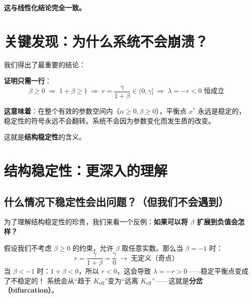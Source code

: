 \documentclass[12pt,a4paper]{article}
\begin{document}
\textbf{这与线性化结论完全一致。}

\section{关键发现：为什么系统不会崩溃？}

我们得出了最重要的结论：

\begin{center}
\end{center}

\textbf{证明只需一行}：
\[
\beta \geq 0 \;\Rightarrow\; 1+\beta \geq 1 \;\Rightarrow\; r = \frac{\gamma}{1+\beta} \in (0, \gamma]
\;\Rightarrow\; \lambda = -r < 0 \text{ 恒成立}
\]

\textbf{这意味着}：在整个有效的参数空间内（$\alpha \geq 0, \beta \geq 0$），平衡点 $x^*$ 永远是稳定的，稳定性的符号永远不会翻转。系统不会因为参数变化而发生质的改变。

这就是\textbf{结构稳定性}的含义。

\section{结构稳定性：更深入的理解}

\subsection{什么情况下稳定性会出问题？（但我们不会遇到）}

为了理解结构稳定性的珍贵，我们来看一个反例：\textbf{如果可以将 $\beta$ 扩展到负值会怎样？}

假设我们不考虑 $\beta \geq 0$ 的约束，允许 $\beta$ 取任意实数。那么当 $\beta = -1$ 时：
\[
r = \frac{\gamma}{1+\beta} = \frac{\gamma}{0} \;\rightarrow\; \text{无定义（奇点）}
\]
当 $\beta < -1$ 时：$1+\beta < 0$，所以 $r < 0$，这会导致 $\lambda = -r > 0$——稳定平衡点变成了不稳定的！
系统会从``趋于 $K_{\text{eff}}$''变为``远离 $K_{\text{eff}}$''——这就是\textbf{分岔（bifurcation）}。
\end{document}
